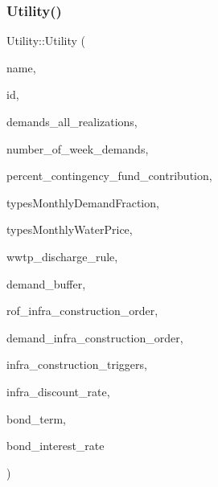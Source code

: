 \subsubsection{\texorpdfstring{Utility()}{Utility()}\hspace{0.1cm}{\footnotesize\ttfamily [3/4]}}
{\footnotesize\ttfamily Utility\+::\+Utility (\begin{DoxyParamCaption}\item[{const char $\ast$}]{name,  }\item[{int}]{id,  }\item[{vector$<$ vector$<$ double $>$$>$ \&}]{demands\+\_\+all\+\_\+realizations,  }\item[{int}]{number\+\_\+of\+\_\+week\+\_\+demands,  }\item[{const double}]{percent\+\_\+contingency\+\_\+fund\+\_\+contribution,  }\item[{const vector$<$ vector$<$ double $>$$>$ \&}]{types\+Monthly\+Demand\+Fraction,  }\item[{const vector$<$ vector$<$ double $>$$>$ \&}]{types\+Monthly\+Water\+Price,  }\item[{\mbox{\hyperlink{classWwtpDischargeRule}{Wwtp\+Discharge\+Rule}}}]{wwtp\+\_\+discharge\+\_\+rule,  }\item[{double}]{demand\+\_\+buffer,  }\item[{const vector$<$ int $>$ \&}]{rof\+\_\+infra\+\_\+construction\+\_\+order,  }\item[{const vector$<$ int $>$ \&}]{demand\+\_\+infra\+\_\+construction\+\_\+order,  }\item[{const vector$<$ double $>$ \&}]{infra\+\_\+construction\+\_\+triggers,  }\item[{double}]{infra\+\_\+discount\+\_\+rate,  }\item[{double}]{bond\+\_\+term,  }\item[{double}]{bond\+\_\+interest\+\_\+rate }\end{DoxyParamCaption})}

